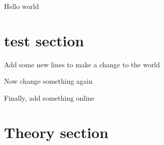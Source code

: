 \documentclass{article}
\begin{document}
	Hello world
	
	\section{test section}
	
	Add some new lines to make a change to the world

Now change something again

Finally, add something online

\section{Theory section}
\end{document}
